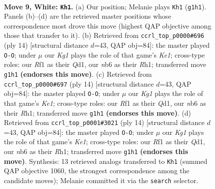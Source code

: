 \documentclass[11pt]{article}
\begin{document}
\clearpage

\begin{figure}[p]\centering
\begin{subfigure}{0.46\textwidth}\centering
\resizebox{\linewidth}{!}{%
\newchessgame
\chessboard[
  setfen={r1bqkb1r/ppp3p1/1nn5/4pp1p/8/2NP1NP1/PP2PPBP/R1BQ1RK1 w kq - 0 9},
  showmover=false,
  pgfstyle=straightmove, color=movearrow, markmove={g1-h1}
]}
\caption{}
\end{subfigure}\hfill
\begin{subfigure}{0.46\textwidth}\centering
\resizebox{\linewidth}{!}{%
\newchessgame
\chessboard[
  setfen={r1bqk2r/ppp1bppp/1nn5/4p3/8/2NP1NP1/PP2PPBP/R1BQK2R w KQkq - 3 8},
  showmover=false,
  pgfstyle=straightmove, color=movearrow, markmove={e1-g1}
]}
\caption{}
\end{subfigure}
\\[4pt]
\begin{subfigure}{0.46\textwidth}\centering
\resizebox{\linewidth}{!}{%
\newchessgame
\chessboard[
  setfen={r1bqk2r/ppp1bppp/1nn5/4p3/8/2NP1NP1/PP2PPBP/R1BQK2R w KQkq - 3 8},
  showmover=false,
  pgfstyle=straightmove, color=movearrow, markmove={e1-g1}
]}
\caption{}
\end{subfigure}\hfill
\begin{subfigure}{0.46\textwidth}\centering
\resizebox{\linewidth}{!}{%
\newchessgame
\chessboard[
  setfen={r1bqk2r/ppp1bppp/1nn5/4p3/8/2NP1NP1/PP2PPBP/R1BQK2R w KQkq - 3 8},
  showmover=false,
  pgfstyle=straightmove, color=movearrow, markmove={e1-g1}
]}
\caption{}
\end{subfigure}
\caption{\textbf{Move 9, White: \texttt{Kh1}.} (a) Our position; Melanie plays \texttt{Kh1} (\texttt{g1h1}). Panels (b)--(d) are the retrieved master positions whose correspondence most drove this move (highest QAP objective among those that transfer to it). (b) Retrieved from \texttt{ccrl\_top\_p0000\#696} (ply 14) [structural distance $d$=43, QAP obj=84]: the master played \texttt{O-O}; under $\mu$ our \emph{Kg1} plays the role of that game's \emph{Ke1}; cross-type roles: our \emph{R}f1 as their \emph{Q}d1, our \emph{n}b6 as their \emph{R}h1; transferred move \texttt{g1h1} \textbf{(endorses this move)}. (c) Retrieved from \texttt{ccrl\_top\_p0000\#697} (ply 14) [structural distance $d$=43, QAP obj=84]: the master played \texttt{O-O}; under $\mu$ our \emph{Kg1} plays the role of that game's \emph{Ke1}; cross-type roles: our \emph{R}f1 as their \emph{Q}d1, our \emph{n}b6 as their \emph{R}h1; transferred move \texttt{g1h1} \textbf{(endorses this move)}. (d) Retrieved from \texttt{ccrl\_top\_p0001\#3021} (ply 14) [structural distance $d$=43, QAP obj=84]: the master played \texttt{O-O}; under $\mu$ our \emph{Kg1} plays the role of that game's \emph{Ke1}; cross-type roles: our \emph{R}f1 as their \emph{Q}d1, our \emph{n}b6 as their \emph{R}h1; transferred move \texttt{g1h1} \textbf{(endorses this move)}. Synthesis: 13 retrieved analogs transferred to \texttt{Kh1} (summed QAP objective 1060, the strongest correspondence among the candidate moves); Melanie committed it via the \texttt{search} selector.}
\label{fig:thought-m16}
\end{figure}
\end{document}
